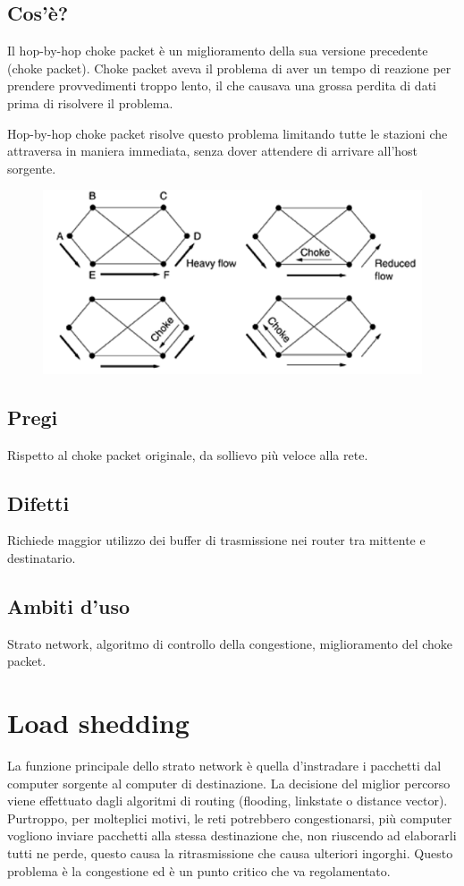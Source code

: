 \subsection{Cos'è?}
Il hop-by-hop choke packet è un miglioramento della sua versione precedente (choke packet).
Choke packet aveva il problema di aver un tempo di reazione per prendere provvedimenti troppo lento, il che causava una grossa perdita di dati prima di risolvere il problema.

Hop-by-hop choke packet risolve questo problema limitando tutte le stazioni che attraversa in maniera immediata, senza dover attendere di arrivare all’host sorgente.


\begin{figure}[H]
\centering
\includegraphics[scale=0.6]{res/img/36_ChokePacketHopbHop.png}
\end{figure}
 
\subsection{Pregi}
Rispetto al choke packet originale, da sollievo più veloce alla rete.
\subsection{Difetti}
Richiede maggior utilizzo dei buffer di trasmissione nei router tra mittente e destinatario.
\subsection{Ambiti d'uso}
Strato network, algoritmo di controllo della congestione, miglioramento del choke packet.

\section{Load shedding}
La funzione principale dello strato network è quella d’instradare i pacchetti dal computer sorgente al computer di destinazione. La decisione del miglior percorso viene effettuato dagli algoritmi di routing (flooding, linkstate o distance vector). Purtroppo, per molteplici motivi, le reti potrebbero congestionarsi, più computer vogliono inviare pacchetti alla stessa destinazione che, non riuscendo ad elaborarli tutti ne perde, questo causa la ritrasmissione che causa ulteriori ingorghi. Questo problema è la congestione ed è un punto critico che va regolamentato.
